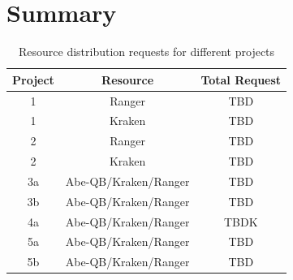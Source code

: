 \documentclass[a4paper,10pt]{article}
\begin{document}
% 



\section*{Summary}

\begin{table}[!h]
\begin{center}
  \caption{Resource distribution requests for different projects  \newline}
\label{table:systems}
\begin{tabular}{|c| c | c | }
\hline 
Project & Resource & Total Request \\ 
\hline
1 & Ranger  & TBD \\
1 & Kraken &  TBD  \\
\hline
2 & Ranger & TBD \\
2 & Kraken & TBD \\
\hline
3a & Abe-QB/Kraken/Ranger & TBD \\
3b & Abe-QB/Kraken/Ranger & TBD \\
\hline
4a & Abe-QB/Kraken/Ranger & TBDK \\
\hline
5a & Abe-QB/Kraken/Ranger & TBD \\
5b & Abe-QB/Kraken/Ranger & TBD \\
\hline
\end{tabular}
\end{center}
\end{table}





%
%


\end{document}
